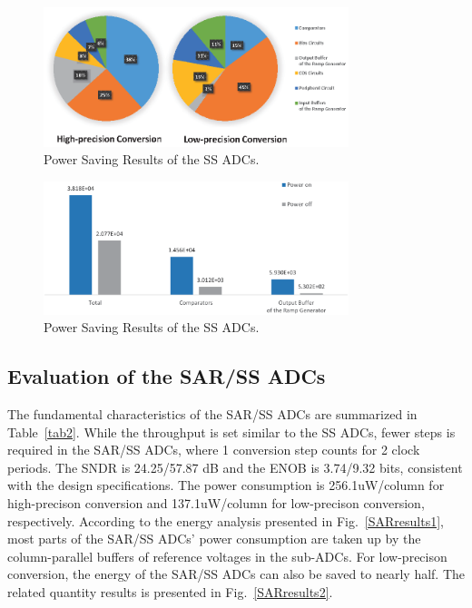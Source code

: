 \documentclass[conference]{IEEEtran}
\begin{document}
\begin{figure}[htbp]
	\centerline{\includegraphics[width=3.5in]{./Figures/SSResults1.eps}}
	\caption{Power Saving Results of the SS ADCs.}
	\label{SSresults1}
\end{figure}

\begin{figure}[htbp]
	\centerline{\includegraphics[width=3.5in]{./Figures/SSResults2.eps}}
	\caption{Power Saving Results of the SS ADCs.}
	\label{SSresults2}
\end{figure} 

\subsection{Evaluation of the SAR/SS ADCs}

The fundamental characteristics of the SAR/SS ADCs are summarized in Table~\ref{tab2}. 
While the throughput is set similar to the SS ADCs, fewer steps is required in the SAR/SS ADCs, where 1 conversion step counts for 2 clock periods. 
The SNDR is 24.25/57.87 dB and the ENOB is 3.74/9.32 bits, consistent with the design specifications. 
The power consumption is 256.1uW/column for high-precison conversion and 137.1uW/column for low-precison conversion, respectively. 
According to the energy analysis presented in Fig.~\ref{SARresults1}, most parts of the SAR/SS ADCs' power consumption 
are taken up by the column-parallel buffers of reference voltages in the sub-ADCs.
For low-precison conversion, the energy of the SAR/SS ADCs can also be saved to nearly half. 
The related quantity results is presented in Fig.~\ref{SARresults2}.
\end{document}
